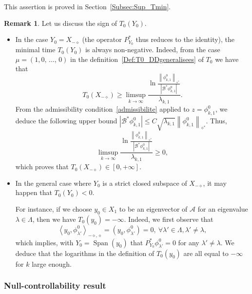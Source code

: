 \documentclass[11pt]{article}
\theoremstyle{definition}
\newtheorem{rema}[theo]{Remark}
\numberwithin{equation}{section}
\numberwithin{figure}{section}
\numberwithin{table}{section}
\newcommand\A{\mathcal{A}}
\newcommand\Bs{\mathcal{B}^*}
\newcommand{\Xun}{X_1}
\newcommand{\Xmalpha}{X_{-\diamond}}
\newcommand{\Fzp}{Y_0}
\newcommand{\normeXalphas}[1]{\left\| #1 \right\|_{\diamond^*}}
\newcommand{\psX}[2]{\left(#1, #2 \right)}
\newcommand{\dual}[2]{\left\langle #1, #2 \right\rangle_{-\diamond,\diamond}}
\newcommand{\PFa}{P_{\Fzp}^*}
\DeclareMathOperator{\Span}{Span}
\let\oldforall\forall
\renewcommand*{\forall}{\mathrel{\oldforall}}
\begin{document}
This assertion is proved in Section~\ref{Subsec:Sup_Tmin}.


\begin{rema} \label{Rmq:T0positif}
Let us discuss the sign of $T_0(\Fzp)$.
\begin{itemize}
\item In the case $\Fzp=\Xmalpha$ (the operator $\PFa$ thus reduces to the identity), the minimal time $T_0(\Fzp)$ is always non-negative. Indeed, from the case $\mu = (1, 0,\,\dotsc,\,0)$ in the definition~\eqref{Def:T0_DDgeneralisees} of $T_0$ we have that
\[
T_0(\Xmalpha) \geq \limsup_{k\to \infty} \frac{\ln \frac{ \normeXalphas{\phi_{k,1}^0 } }{ \left| \Bs \phi_{k,1}^0 \right|}}{\lambda_{k,1}}.
\]
From the admissibility condition~\eqref{admissibilite} applied to $z=\phi_{k,1}^0$, we deduce the following upper bound $\left| \Bs \phi_{k,1}^0 \right| \leq C \sqrt{\lambda_{k,1}}\normeXalphas{\phi_{k,1}^0 }$. Thus,
\[
\limsup_{k\to \infty} \frac{\ln \frac{ \normeXalphas{\phi_{k,1}^0 } }{ \left| \Bs \phi_{k,1}^0 \right|}}{\lambda_{k,1}} \geq 0,
\]
which proves that $T_0(\Xmalpha) \in [0,+\infty]$.
\item In the general case where $\Fzp$ is a strict closed subspace of $\Xmalpha$, it may happen that $T_0(\Fzp)<0$.

For instance, if we choose $y_0\in \Xun$ to be an eigenvector of $\A$ for an eigenvalue $\lambda\in \Lambda$, then we have $T_0(y_0)=-\infty$. Indeed, we first observe that
\[
\dual{y_0}{\phi_{\lambda'}^0} = \psX{y_0}{\phi_{\lambda'}^0} = 0, \ \forall \lambda'\in \Lambda, \lambda'\neq \lambda,
\]
which implies, with $\Fzp=\Span(y_0)$ that $\PFa \phi_{\lambda'}^0=0$ for any $\lambda'\neq \lambda$. We deduce that the logarithms in the definition of $T_0(y_0)$ are all equal to $-\infty$ for $k$ large enough.
\end{itemize}
\end{rema}



\subsubsection{Null-controllability result}\label{Sect:mainresult}
\end{document}
